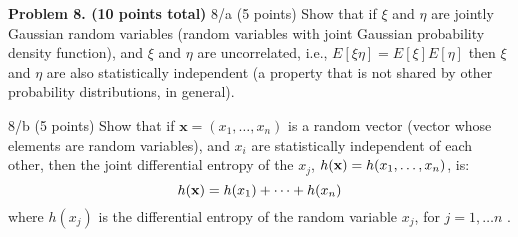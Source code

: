 \documentclass[epsfig]{article}
\def\bpar{\vskip26pt}
\def\npar{\vskip13pt}
\def\spar{\vskip10pt}
\begin{document}
\bpar
{\bf Problem 8. (10 points total)}
\spar
8/a (5 points)
Show that if $\xi$ and  $\eta$ are jointly Gaussian random variables (random variables with joint 
Gaussian probability density function), and $\xi$ and  $\eta$ are uncorrelated, i.e., $E[\xi\eta] = E[\xi]E[\eta]$ 
then $\xi$ and $\eta$ are also statistically independent 
(a property that is not shared by other probability distributions, in general).

\npar
8/b (5 points)
Show that if ${\mathbf x} = (x_1, \dots , x_n)$ is a random vector (vector whose elements are random variables), and $x_i$ are statistically independent of each other, then the joint differential entropy of the $x_j$, $h({\bf x}) = h(x_1, \dots , x_n)$, is: 
$$h({\bf x}) = h(x_1) + \dots + h(x_n)$$
where $h(x_j)$ is the differential entropy of the random variable $x_j$, for $j=1, \dots n$ .
\end{document}

